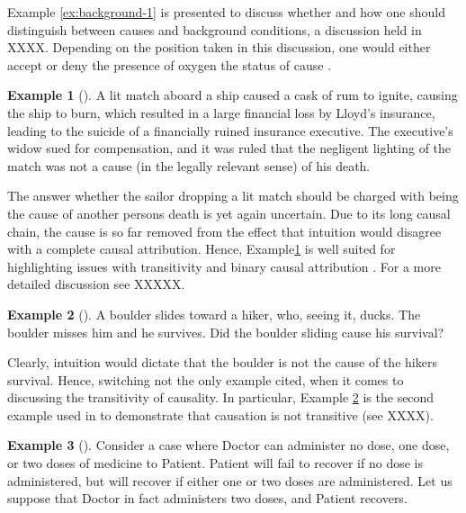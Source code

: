 \documentclass[11pt,a4paper]{book}
\theoremstyle{definition}
\theoremstyle{definition}
\newtheorem{example}{Example}[section]
\theoremstyle{definition}
\theoremstyle{remark}
\begin{document}
Example \ref{ex:background-1} is presented to discuss whether and how one should distinguish between causes and background conditions, a discussion held in XXXX.
Depending on the position taken in this discussion, one would either accept or deny the presence of oxygen the status of cause \parencite{halpern2015graded}.

\begin{example}[\cite{halpern2015graded}]
\label{ex:damping-1}
A lit match aboard a ship caused a cask of rum to ignite, causing the ship to burn, which resulted in a large financial loss by Lloyd’s insurance, leading to the suicide of a financially ruined insurance executive. The executive’s widow sued for compensation, and it was ruled that the negligent lighting of the match was not a cause (in the legally relevant sense) of his death.
 \end{example}

The answer whether the sailor dropping a lit match should be charged with being the cause of another persons death is yet again uncertain.
Due to its long causal chain, the cause is so far removed from the effect that intuition would disagree with a complete causal attribution. Hence, Example\ref{ex:damping-1} is well suited for highlighting issues with transitivity and binary causal attribution \parencite{halpern2015graded}. For a more detailed discussion see XXXXX.



\begin{example}[\cite{glymour2010actual}]
\label{ex:transitivity-1}
A boulder slides toward a hiker, who, seeing it, ducks. The boulder misses him and he survives. Did the boulder sliding cause his survival?
 \end{example}
 
Clearly, intuition would dictate that the boulder is not the cause of the hikers survival.
Hence, switching not the only example cited, when it comes to discussing the transitivity of causality. In particular, Example \ref{ex:transitivity-1} is the second example used in \parencite{hitchcock2001intransitivity}
to demonstrate that causation is not transitive (see XXXX). 


\begin{example}[\cite{blanchard2017cause}]
\label{ex:contrastive-1}
Consider a case where Doctor can administer no dose, one dose, or two doses of medicine to Patient. Patient will fail to recover if no dose is administered, but will recover if either one or two doses are administered. Let us suppose that Doctor in fact administers two doses, and Patient recovers.
 \end{example}
 
\end{document}
